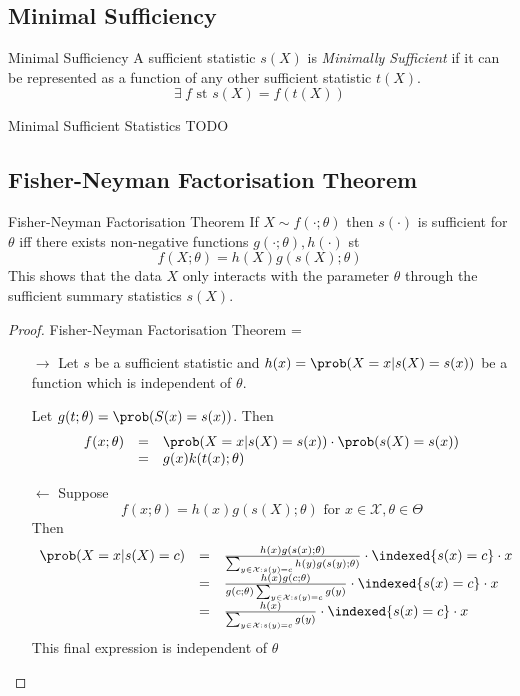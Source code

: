 \documentclass[11pt,a4paper]{article}
\begin{document}
\subsection{Minimal Sufficiency}

  \begin{definition}{Minimal Sufficiency}
    A sufficient statistic $s(X)$ is \textit{Minimally Sufficient} if it can be represented as a function of any other sufficient statistic $t(X)$.
    \[ \exists\ f\text{ st }s(X)=f(t(X)) \]
  \end{definition}

  \begin{example}{Minimal Sufficient Statistics}
    TODO
  \end{example}

\subsection{Fisher-Neyman Factorisation Theorem}

  \begin{theorem}{Fisher-Neyman Factorisation Theorem}
    If $X\sim f(\cdot;\theta)$ then $s(\cdot)$ is sufficient for $\theta$ iff there exists non-negative functions $g(\cdot;\theta),h(\cdot)$ st
    \[ f(X;\theta)=h(X)g(s(X);\theta) \]
    This shows that the data $X$ only interacts with the parameter $\theta$ through the sufficient summary statistics $s(X)$.
  \end{theorem}

  \begin{proof}{Fisher-Neyman Factorisation Theorem}
    \everymath={\displaystyle}
    \begin{itemize}
      \item[$\longrightarrow$] Let $s$ be a sufficient statistic and $h(x)=\prob(X=x|s(X)=s(x))$ be a function which is independent of $\theta$.
      \par Let $g(t;\theta)=\prob(S(x)=s(x))$. Then
      \[\begin{array}{rcl}
        f(x;\theta)&=&\prob(X=x|s(X)=s(x))\cdot\prob(s(X)=s(x))\\
        &=&g(x)k(t(x);\theta)
      \end{array}\]
      \item[$\longleftarrow$] Suppose
      \[ f(x;\theta)=h(x)g(s(X);\theta)\text{ for }x\in\mathcal{X},\theta\in\Theta \]
      Then
      \[\begin{array}{rcl}
        \prob(X=x|s(X)=c)&=&\frac{h(x)g(s(x);\theta)}{\sum_{y\in\mathcal{X}:s(y)=c}h(y)g(s(y);\theta)}\cdot\indexed\{s(x)=c\}\cdot x\\
        &=&\frac{h(x)g(c;\theta)}{g(c;\theta)\sum_{y\in\mathcal{X}:s(y)=c}g(y)}\cdot \indexed\{s(x)=c\}\cdot x\\
        &=&\frac{h(x)}{\sum_{y\in\mathcal{X}:s(y)=c}g(y)}\cdot \indexed\{s(x)=c\}\cdot x
      \end{array}\]
      This final expression is independent of $\theta$
    \end{itemize}
    \proved
  \end{proof}
\end{document}
